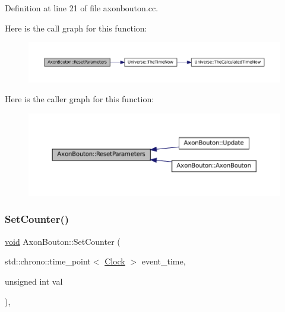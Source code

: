 Definition at line 21 of file axonbouton.\+cc.

Here is the call graph for this function\+:\nopagebreak
\begin{figure}[H]
\begin{center}
\leavevmode
\includegraphics[width=350pt]{class_axon_bouton_a73d3721361c4e1ce6b110ffe1b4a7a88_cgraph}
\end{center}
\end{figure}
Here is the caller graph for this function\+:\nopagebreak
\begin{figure}[H]
\begin{center}
\leavevmode
\includegraphics[width=350pt]{class_axon_bouton_a73d3721361c4e1ce6b110ffe1b4a7a88_icgraph}
\end{center}
\end{figure}
\mbox{\label{class_axon_bouton_afe285478d414f2815afb98abe7b92898}} 
\subsubsection{\texorpdfstring{Set\+Counter()}{SetCounter()}}
{\footnotesize\ttfamily \mbox{\hyperlink{glad_8h_a950fc91edb4504f62f1c577bf4727c29}{void}} Axon\+Bouton\+::\+Set\+Counter (\begin{DoxyParamCaption}\item[{std\+::chrono\+::time\+\_\+point$<$ \mbox{\hyperlink{universe_8h_a0ef8d951d1ca5ab3cfaf7ab4c7a6fd80}{Clock}} $>$}]{event\+\_\+time,  }\item[{unsigned int}]{val }\end{DoxyParamCaption})\hspace{0.3cm}{\ttfamily [inline]}, {\ttfamily [virtual]}}



